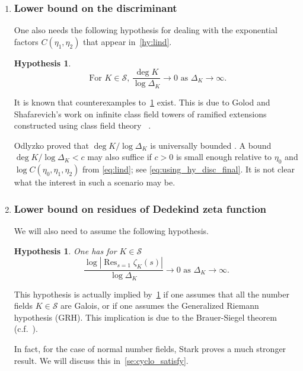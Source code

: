 \documentclass[a4paper]{article}
\newtheorem{hypothesis}[theorem]{Hypothesis}
\theoremstyle{definition}
\theoremstyle{remark}
\DeclareMathOperator{\Res}{Res}
\begin{document}
\begin{enumerate}


\item 
\subsubsection*{Lower bound on the discriminant}

One also needs the following hypothesis for dealing with the exponential factors $C(\eta_{1},\eta_{2})$ 
that appear in~\cref{hy:lind}.
\begin{hypothesis}
\label{hy:disc}
\begin{equation}
    \text{ For $K \in \mathcal{S}$, }\frac{\deg K}{\log\Delta_{K} } \rightarrow  0 \text{ as } \Delta_K \rightarrow  \infty.
\end{equation}
\end{hypothesis}
It is known that counterexamples to~\cref{hy:disc} exist. This is due to Golod and Shafarevich's work on infinite class field towers of ramified extensions constructed using class field theory ~\cite{GS1964}. 

Odlyzko proved that $\deg K / \log \Delta_{K}$ is universally bounded \cite{O1990}.
A bound $\deg K / \log \Delta_{K} < c$ may also suffice if $c>0$ is small enough relative to $\eta_0$ and $\log C(\eta_0,\eta_1,\eta_2)$ from \cref{eq:lind}; see \cref{eq:using_hy_disc_final}.
It is not clear what the interest in such a scenario may be.

\item 
\subsubsection*{Lower bound on residues of Dedekind zeta function}

We will also need to assume the following hypothesis.
\begin{hypothesis}
	One has for $K \in \mathcal{S}$ 
\begin{equation}
 \frac{\log  |\Res_{s=1} \zeta_K(s) |}{ \log \Delta_{K}}  \rightarrow  0 \text{ as } \Delta_{K} \xrightarrow[]{} \infty.
\end{equation}
\label{hy:residue_estimate}
\end{hypothesis}

This hypothesis is actually implied by~\cref{hy:disc} if one assumes that all the number fields $K \in \mathcal{S}$ are Galois, or if one assumes the Generalized Riemann hypothesis (GRH). 
This implication is due to the Brauer-Siegel theorem (c.f.~\cite{S1974}).

In fact, for the case of normal number fields, Stark \cite{S1974} proves a much stronger result. We will discuss this in~\cref{se:cyclo_satisfy}.
\end{enumerate}
\end{document}
